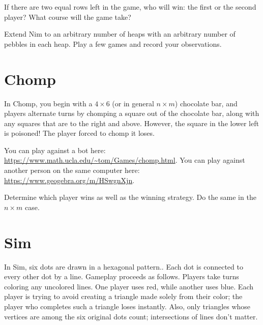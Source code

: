 \documentclass{article}
\begin{document}
\begin{exercise}
    If there are two equal rows left in the game, who will win: the first or the second player?
    What course will the game take?
\end{exercise}

\begin{exercise}
    Extend Nim to an arbitrary number of heaps with an arbitrary number of pebbles in each heap. 
    Play a few games and record your observations.
\end{exercise}

\section{Chomp}

In Chomp, you begin with a \(4\times 6\) (or in general \(n\times m\)) chocolate bar, and players alternate turns by chomping a square out of the chocolate bar, along with any squares that are to the right and above.
However, the square in the lower left is poisoned!
The player forced to chomp it loses.

You can play against a bot here: \url{https://www.math.ucla.edu/~tom/Games/chomp.html}.
You can play against another person on the same computer here: \url{https://www.geogebra.org/m/HSwgnXjn}.


\begin{exercise}
    Determine which player wins as well as the winning strategy.
    Do the same in the \(n\times m\) case.
\end{exercise}

\section{Sim}

In Sim, six dots are drawn in a hexagonal pattern..
Each dot is connected to every other dot by a line.
Gameplay proceeds as follows.
Players take turns coloring any uncolored lines.
One player uses red, while another uses blue.
Each player is trying to avoid creating a triangle made solely from their color; the player who completes such a triangle loses instantly.
Also, only triangles whose vertices are among the six original dots count; intersections of lines don't matter.
\end{document}
